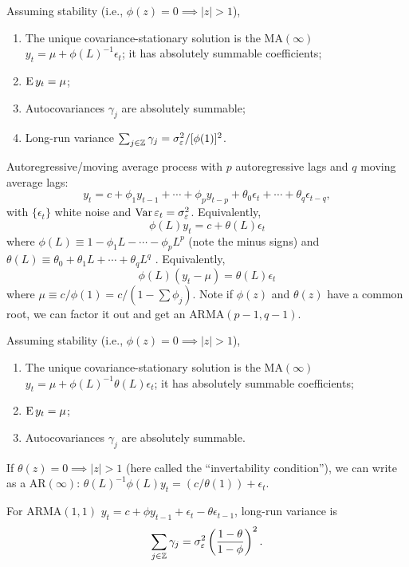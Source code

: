 \documentclass[8pt,letterpaper, landscape]{extarticle} %
\begin{document}
\begin{multicols}{3}
\begin{description}
Assuming stability (i.e., $ \phi (z) = 0 \implies \lvert z \rvert > 1 $),
\begin{enumerate}
\item The unique covariance-stationary solution is the $ \text{MA}(\infty) $ $ y_t = \mu + \phi (L)^{-1} \epsilon_{t} $; it has absolutely summable coefficients;
\item $ \operatorname{E} y_t = \mu $;
\item Autocovariances $ \gamma_j $ are absolutely summable;
\item Long-run variance $ \sum_{j \in \mathbb{Z}} \gamma_j = \sigma^2_\varepsilon / [\phi (1)]^2 $.
\end{enumerate}

 Autoregressive/moving average process with $ p $ autoregressive lags and $ q $ moving average lags:
$$ y_t = c + \phi_1 y_{t-1} + \dotsb + \phi_p y_{t-p} + \theta_0 \epsilon_t + \dotsb + \theta_q \epsilon_{t-q}, $$
with $ \{ \epsilon_t \} $ white noise and $ \operatorname{Var} \varepsilon_t = \sigma^2_\varepsilon $. Equivalently,
$$ \phi (L) y_t = c + \theta (L) \epsilon_t $$
where $ \phi (L) \equiv 1 - \phi_1 L - \dotsb - \phi_p L^p $ (note the minus signs) and $ \theta (L) \equiv \theta_0 + \theta_1 L + \dotsb + \theta_q L^q $ . Equivalently,
$$ \phi (L) (y_t - \mu) = \theta (L) \epsilon_t $$
where $ \mu \equiv c / \phi (1) = c / (1 - \sum \phi_j) $. Note if $ \phi (z) $ and $ \theta (z) $ have a common root, we can factor it out and get an $ \text{ARMA} (p-1, q-1) $.

Assuming stability (i.e., $ \phi (z) = 0 \implies \lvert z \rvert > 1 $),
\begin{enumerate}
\item The unique covariance-stationary solution is the $ \text{MA}(\infty) $ $ y_t = \mu + \phi (L)^{-1} \theta (L) \epsilon_{t} $; it has absolutely summable coefficients;
\item $ \operatorname{E} y_t = \mu $;
\item Autocovariances $ \gamma_j $ are absolutely summable.
\end{enumerate}
If $ \theta (z) = 0 \implies \lvert z \rvert > 1 $ (here called the ``invertability condition''), we can write as a $ \text{AR}(\infty) $: $ \theta (L)^{-1} \phi (L) y_t = (c / \theta(1)) + \epsilon_t $.

For $ \text{ARMA} (1,1) $ $ y_t = c + \phi y_{t-1} + \epsilon_t - \theta \epsilon_{t-1} $, long-run variance is
\[ \sum_{j \in \mathbb{Z}} \gamma_{j} = \sigma_{\varepsilon}^{2} \left( \frac{1 - \theta}{1 - \phi} \right)^{2}. \]


\end{description}
\end{multicols}
\end{document}
